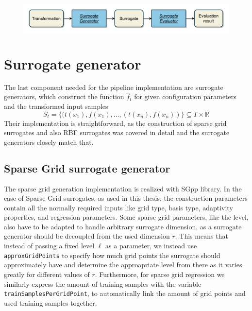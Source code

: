 \documentclass[
  a4paper,  %
  twoside,  %
  bibliography=totoc,
  headsepline,
  cleardoublepage=empty,
  parskip=half,
  draft=false
]{scrbook}
\begin{document}
\newpage
\begin{mdframed}[style=style,frametitle={Transformation evaluator (forward looking)}]
\begin{figure}[H]
\includegraphics[width=\textwidth]{graphics/TransformationEval.pdf}
\delimit

\label{fig:te}
\end{figure}
\end{mdframed}

\section {Surrogate generator}
\label{sec:sg}

The last component needed for the pipeline implementation are surrogate generators, which construct the function $\hat{f}_t$ for given configuration parameters and the transformed input samples
\begin{equation}
S_t=\{(t(x_1), f(x_1), \dots, (t(x_n), f(x_n))\} \subseteq T \times \mathds{R}
\end{equation}
Their implementation is straightforward, as the construction of sparse grid surrogates and also RBF surrogates was covered in detail and the surrogate generators closely match that.


\subsection {Sparse Grid surrogate generator}

The sparse grid generation implementation is realized with SGpp \cite{} library.
In the case of Sparse Grid surrogates, as used in this thesis, the construction parameters contain all the normally required inputs like grid type, basis type, adaptivity properties, and regression parameters.
Some sparse grid parameters, like the level, also have to be adapted to handle arbitrary surrogate dimension, as a surrogate generator should be decoupled from the used dimension $r$. 
This means that instead of passing a fixed level $\ell$ as a parameter, we instead use \texttt{approxGridPoints} to specify how much grid points the surrogate should approximately have and determine the approapriate level from there as it varies greatly for different values of $r$.
Furthermore, for sparse grid regression we similarly express the amount of training samples with the variable \texttt{trainSamplesPerGridPoint}, to automatically link the amount of grid points and used training samples together.
\end{document}
